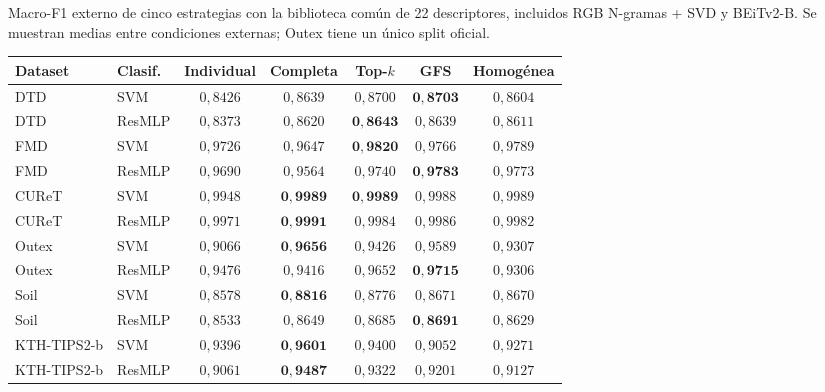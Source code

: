 \begin{resulttable}
\centering\fontsize{8}{10}\selectfont\setlength{\tabcolsep}{3.0pt}
\caption{Macro-F1 externo de cinco estrategias con la biblioteca común de 22 descriptores, incluidos RGB N-gramas + SVD y BEiTv2-B. Se muestran medias entre condiciones externas; Outex tiene un único split oficial.}
\label{tab:resultados-confirmatorios}
\begin{tabular}{@{}llccccc@{}}
\toprule
Dataset & Clasif. & Individual & Completa & Top-$k$ & GFS & Homogénea \\
\midrule
DTD & SVM & $0{,}8426$ & $0{,}8639$ & $0{,}8700$ & $\mathbf{0{,}8703}$ & $0{,}8604$ \\
DTD & ResMLP & $0{,}8373$ & $0{,}8620$ & $\mathbf{0{,}8643}$ & $0{,}8639$ & $0{,}8611$ \\
FMD & SVM & $0{,}9726$ & $0{,}9647$ & $\mathbf{0{,}9820}$ & $0{,}9766$ & $0{,}9789$ \\
FMD & ResMLP & $0{,}9690$ & $0{,}9564$ & $0{,}9740$ & $\mathbf{0{,}9783}$ & $0{,}9773$ \\
CUReT & SVM & $0{,}9948$ & $\mathbf{0{,}9989}$ & $\mathbf{0{,}9989}$ & $0{,}9988$ & $0{,}9989$ \\
CUReT & ResMLP & $0{,}9971$ & $\mathbf{0{,}9991}$ & $0{,}9984$ & $0{,}9986$ & $0{,}9982$ \\
Outex & SVM & $0{,}9066$ & $\mathbf{0{,}9656}$ & $0{,}9426$ & $0{,}9589$ & $0{,}9307$ \\
Outex & ResMLP & $0{,}9476$ & $0{,}9416$ & $0{,}9652$ & $\mathbf{0{,}9715}$ & $0{,}9306$ \\
Soil & SVM & $0{,}8578$ & $\mathbf{0{,}8816}$ & $0{,}8776$ & $0{,}8671$ & $0{,}8670$ \\
Soil & ResMLP & $0{,}8533$ & $0{,}8649$ & $0{,}8685$ & $\mathbf{0{,}8691}$ & $0{,}8629$ \\
KTH-TIPS2-b & SVM & $0{,}9396$ & $\mathbf{0{,}9601}$ & $0{,}9400$ & $0{,}9052$ & $0{,}9271$ \\
KTH-TIPS2-b & ResMLP & $0{,}9061$ & $\mathbf{0{,}9487}$ & $0{,}9322$ & $0{,}9201$ & $0{,}9127$ \\
\bottomrule
\end{tabular}
\end{resulttable}
\FloatBarrier
